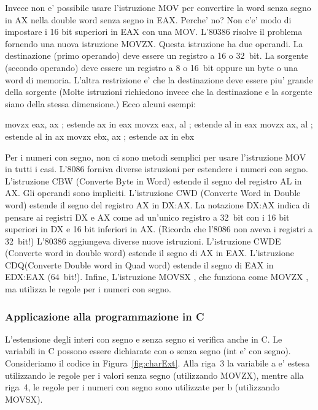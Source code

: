 Invece non e' possibile usare l'istruzione {\code MOV} per convertire
la word senza segno in AX nella double word senza segno in EAX. Perche'
no? Non c'e' modo di impostare i 16 bit superiori in EAX con una {\code
MOV}. L'80386 risolve il problema fornendo una nuova istruzione {\code
MOVZX}.  Questa istruzione ha due operandi. La destinazione
(primo operando) deve essere un registro a 16 o 32~bit. La sorgente
(secondo operando) deve essere un registro a 8 o 16~bit oppure un byte
o una word di memoria. L'altra restrizione e' che la destinazione deve
essere piu' grande della sorgente (Molte istruzioni richiedono invece
che la destinazione e la sorgente siano della stessa dimensione.)
Ecco alcuni esempi:
\begin{AsmCodeListing}[numbers=none,frame=none]
      movzx  eax, ax      ; estende ax in eax
      movzx  eax, al      ; estende al in eax
      movzx  ax, al       ; estende al in ax
      movzx  ebx, ax      ; estende ax in ebx
\end{AsmCodeListing}

Per i numeri con segno, non ci sono metodi semplici per usare 
l'istruzione {\code MOV} in tutti i casi. L'8086 forniva diverse
istruzioni per estendere i numeri con segno. L'istruzione {\code CBW} 
(Converte Byte in Word) estende il segno del registro AL in AX. Gli 
operandi sono impliciti. L'istruzione {\code CWD}  (Converte Word
in Double word) estende il segno del registro AX in DX:AX. La notazione
DX:AX indica di pensare ai registri DX e AX come ad un'unico registro
a 32~bit con i 16 bit superiori in DX e 16 bit inferiori in AX. (Ricorda
che l'8086 non aveva i registri a 32~bit!) L'80386 aggiungeva 
diverse nuove istruzioni. L'istruzione {\code CWDE} 
(Converte word in double word) estende il segno di AX in EAX. L'istruzione
{\code CDQ}(Converte Double word in Quad word) estende
il segno di EAX in EDX:EAX  (64~bit!). Infine,
L'istruzione {\code MOVSX} , che funziona come {\code MOVZX}
, ma utilizza le regole per i numeri con segno. 
 
\subsubsection{Applicazione alla programmazione in C}

L'estensione  degli
interi con segno e senza segno si verifica anche in C. Le variabili in C
possono essere dichiarate con o senza segno ({\code int} e' con segno).
Consideriamo il codice in Figura~\ref{fig:charExt}. Alla riga~3 la
variabile {\code a} e' estesa utilizzando le regole per i valori senza
segno (utilizzando {\code MOVZX}), mentre alla riga~4, le regole per i 
numeri con segno sono utilizzate per {\code b} (utilizzando {\code MOVSX}).

